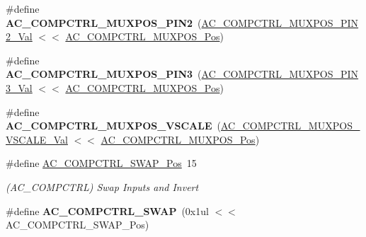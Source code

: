 \begin{DoxyCompactItemize}
\item 
\hypertarget{group___s_a_m_l21___a_c_ga24dbe859525947ff8ef774eab4379c2d}{}\#define {\bfseries A\+C\+\_\+\+C\+O\+M\+P\+C\+T\+R\+L\+\_\+\+M\+U\+X\+P\+O\+S\+\_\+\+P\+I\+N2}~(\hyperlink{group___s_a_m_l21___a_c_ga6e55540b07d767a9d998e64c7d27972b}{A\+C\+\_\+\+C\+O\+M\+P\+C\+T\+R\+L\+\_\+\+M\+U\+X\+P\+O\+S\+\_\+\+P\+I\+N2\+\_\+\+Val}   $<$$<$ \hyperlink{group___s_a_m_l21___a_c_gad4bb8c36791a0ea8139ae435b00e4365}{A\+C\+\_\+\+C\+O\+M\+P\+C\+T\+R\+L\+\_\+\+M\+U\+X\+P\+O\+S\+\_\+\+Pos})\label{group___s_a_m_l21___a_c_ga24dbe859525947ff8ef774eab4379c2d}

\item 
\hypertarget{group___s_a_m_l21___a_c_ga775cb5728b8e3fb15299d53999c7c77b}{}\#define {\bfseries A\+C\+\_\+\+C\+O\+M\+P\+C\+T\+R\+L\+\_\+\+M\+U\+X\+P\+O\+S\+\_\+\+P\+I\+N3}~(\hyperlink{group___s_a_m_l21___a_c_ga3fa0d80ee6e615fa69c31af219f66c4a}{A\+C\+\_\+\+C\+O\+M\+P\+C\+T\+R\+L\+\_\+\+M\+U\+X\+P\+O\+S\+\_\+\+P\+I\+N3\+\_\+\+Val}   $<$$<$ \hyperlink{group___s_a_m_l21___a_c_gad4bb8c36791a0ea8139ae435b00e4365}{A\+C\+\_\+\+C\+O\+M\+P\+C\+T\+R\+L\+\_\+\+M\+U\+X\+P\+O\+S\+\_\+\+Pos})\label{group___s_a_m_l21___a_c_ga775cb5728b8e3fb15299d53999c7c77b}

\item 
\hypertarget{group___s_a_m_l21___a_c_ga6439f9324cc3d354ac70cb350b394d16}{}\#define {\bfseries A\+C\+\_\+\+C\+O\+M\+P\+C\+T\+R\+L\+\_\+\+M\+U\+X\+P\+O\+S\+\_\+\+V\+S\+C\+A\+L\+E}~(\hyperlink{group___s_a_m_l21___a_c_ga4e6961d30aa8bf0ed3f905ac3169ebdf}{A\+C\+\_\+\+C\+O\+M\+P\+C\+T\+R\+L\+\_\+\+M\+U\+X\+P\+O\+S\+\_\+\+V\+S\+C\+A\+L\+E\+\_\+\+Val} $<$$<$ \hyperlink{group___s_a_m_l21___a_c_gad4bb8c36791a0ea8139ae435b00e4365}{A\+C\+\_\+\+C\+O\+M\+P\+C\+T\+R\+L\+\_\+\+M\+U\+X\+P\+O\+S\+\_\+\+Pos})\label{group___s_a_m_l21___a_c_ga6439f9324cc3d354ac70cb350b394d16}

\item 
\hypertarget{group___s_a_m_l21___a_c_ga4e28f151d0fc3d299c8d3be58f7af79d}{}\#define \hyperlink{group___s_a_m_l21___a_c_ga4e28f151d0fc3d299c8d3be58f7af79d}{A\+C\+\_\+\+C\+O\+M\+P\+C\+T\+R\+L\+\_\+\+S\+W\+A\+P\+\_\+\+Pos}~15\label{group___s_a_m_l21___a_c_ga4e28f151d0fc3d299c8d3be58f7af79d}

\begin{DoxyCompactList}\small\item\em (A\+C\+\_\+\+C\+O\+M\+P\+C\+T\+R\+L) Swap Inputs and Invert \end{DoxyCompactList}\item 
\hypertarget{group___s_a_m_l21___a_c_gaae20e0370c320f90205e0f35a6142a91}{}\#define {\bfseries A\+C\+\_\+\+C\+O\+M\+P\+C\+T\+R\+L\+\_\+\+S\+W\+A\+P}~(0x1ul $<$$<$ A\+C\+\_\+\+C\+O\+M\+P\+C\+T\+R\+L\+\_\+\+S\+W\+A\+P\+\_\+\+Pos)\label{group___s_a_m_l21___a_c_gaae20e0370c320f90205e0f35a6142a91}


\end{DoxyCompactItemize}
